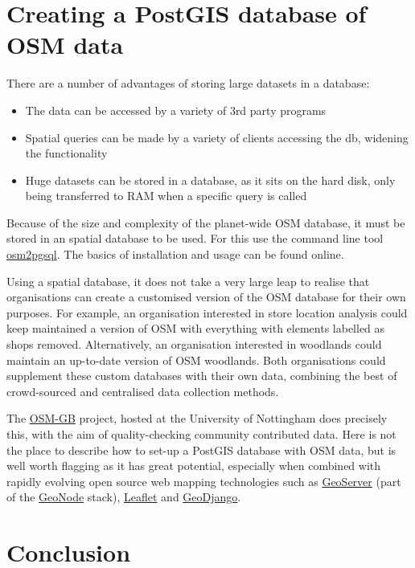 \documentclass[]{article}
\begin{document}
\section{Creating a PostGIS database of OSM data}

There are a number of advantages of storing large datasets in a
database:

\begin{itemize}
\item
  The data can be accessed by a variety of 3rd party programs
\item
  Spatial queries can be made by a variety of clients accessing the db,
  widening the functionality
\item
  Huge datasets can be stored in a database, as it sits on the hard
  disk, only being transferred to RAM when a specific query is called
\end{itemize}
Because of the size and complexity of the planet-wide OSM database, it
must be stored in an spatial database to be used. For this use the
command line tool
\href{http://wiki.openstreetmap.org/wiki/Osm2pgsql}{osm2pgsql}. The
basics of installation and usage can be found online.

Using a spatial database, it does not take a very large leap to realise
that organisations can create a customised version of the OSM database
for their own purposes. For example, an organisation interested in store
location analysis could keep maintained a version of OSM with everything
with elements labelled as shops removed. Alternatively, an organisation
interested in woodlands could maintain an up-to-date version of OSM
woodlands. Both organisations could supplement these custom databases
with their own data, combining the best of crowd-sourced and centralised
data collection methods.

The \href{http://wiki.openstreetmap.org/wiki/Osm2pgsql}{OSM-GB} project,
hosted at the University of Nottingham does precisely this, with the aim
of quality-checking community contributed data. Here is not the place to
describe how to set-up a PostGIS database with OSM data, but is well
worth flagging as it has great potential, especially when combined with
rapidly evolving open source web mapping technologies such as
\href{http://geoserver.org/display/GEOS/Welcome}{GeoServer} (part of the
\href{http://geonode.org/}{GeoNode} stack),
\href{http://leafletjs.com/}{Leaflet} and
\href{https://www.djangoproject.com/}{GeoDjango}.

\section{Conclusion}
\end{document}
